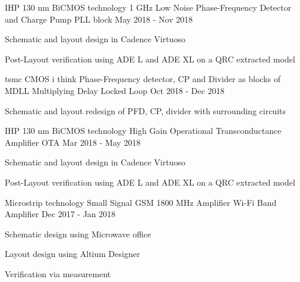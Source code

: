 \begin{cventries}

\cventry
{IHP 130 nm BiCMOS technology} %
{1 GHz Low Noise Phase-Frequency Detector and Charge Pump} %
{PLL block} %
{May 2018 - Nov 2018} %
{ %
\begin{cvitems}
    \item {Schematic and layout design in Cadence Virtuoso}
    \item {Post-Layout verification using ADE L and ADE XL on a QRC extracted model}
\end{cvitems}
}


\cventry
{tsmc CMOS  i think} %
{Phase-Frequency detector, CP and Divider as blocks of MDLL} %
{Multiplying Delay Locked Loop} %
{Oct 2018 - Dec 2018} %
{ %
\begin{cvitems}
    \item {Schematic and layout redesign of PFD, CP, divider with surrounding circuits}
\end{cvitems}
}

\cventry
{IHP 130 nm BiCMOS technology} %
{High Gain Operational Transconductance Amplifier} %
{OTA} %
{Mar 2018 - May 2018} %
{ %
\begin{cvitems}
    \item {Schematic and layout design in Cadence Virtuoso}
    \item {Post-Layout verification using ADE L and ADE XL on a QRC extracted model}
\end{cvitems}
}


\cventry
{Microstrip technology} %
{Small Signal GSM 1800 MHz Amplifier} %
{Wi-Fi Band Amplifier} %
{Dec 2017 - Jan 2018} %
{ %
\begin{cvitems}
    \item {Schematic design using Microwave office}
    \item {Layout design using Altium Designer}
    \item {Verification via measurement} %
\end{cvitems}
}


\end{cventries}
